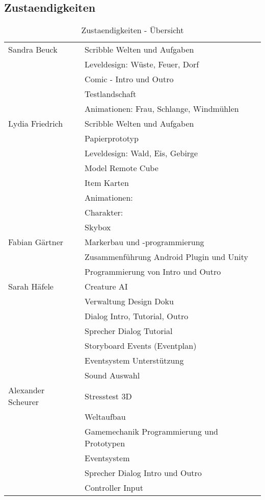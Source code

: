 \subsection{Zustaendigkeiten}
\begin{table}[hc]
\begin{center}
\begin{tabular}[hc]{l|l}
\hline
Sandra Beuck & Scribble Welten und Aufgaben\\
& Leveldesign: Wüste, Feuer, Dorf\\
& Comic - Intro und Outro\\
& Testlandschaft\\
& Animationen: Frau, Schlange, Windmühlen\\
\hline
Lydia Friedrich & Scribble Welten und Aufgaben\\
& Papierprototyp\\
& Leveldesign: Wald, Eis, Gebirge\\
& Model Remote Cube\\
& Item Karten\\
& Animationen:\\
& Charakter:\\
& Skybox\\
\hline
Fabian Gärtner & Markerbau und -programmierung\\
& Zusammenführung Android Plugin und Unity\\
& Programmierung von Intro und Outro\\
\hline
Sarah Häfele & Creature AI\\
& Verwaltung Design Doku\\
& Dialog Intro, Tutorial, Outro\\
& Sprecher Dialog Tutorial\\
& Storyboard Events (Eventplan)\\
& Eventsystem Unterstützung\\
& Sound Auswahl\\
\hline
Alexander Scheurer & Stresstest 3D\\
& Weltaufbau\\
& Gamemechanik Programmierung und Prototypen\\
& Eventsystem\\
& Sprecher Dialog Intro und Outro\\
& Controller Input\\
\end{tabular}
\caption{Zustaendigkeiten - Übersicht}
\label{tab:aufgaben}
\end{center}
\end{table}